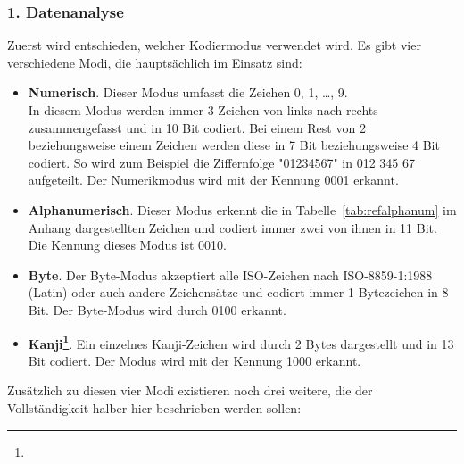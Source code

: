 \subsubsection*{1. Datenanalyse}
Zuerst wird entschieden, welcher Kodiermodus verwendet wird. Es gibt vier verschiedene Modi, die hauptsächlich im Einsatz sind: 
\begin{itemize}
	\item \textbf{Numerisch}. Dieser Modus umfasst die Zeichen  0, 1, \dots, 9. \\
	In diesem Modus werden immer 3 Zeichen von links nach rechts zusammengefasst und in 10 Bit codiert. Bei einem Rest von 2 beziehungsweise einem Zeichen werden diese in 7 Bit beziehungsweise 4 Bit codiert. So wird zum Beispiel die Ziffernfolge "01234567"{} in 012 345 67 aufgeteilt. Der Numerikmodus wird mit der Kennung 0001 erkannt.
	\item \textbf{Alphanumerisch}. Dieser Modus erkennt die in Tabelle~\ref{tab:refalphanum} im Anhang dargestellten Zeichen und codiert immer zwei von ihnen in 11 Bit. Die Kennung dieses Modus ist 0010.
	\item \textbf{Byte}. Der Byte-Modus akzeptiert alle ISO-Zeichen nach ISO-8859-1:1988 (Latin)  oder auch andere Zeichensätze und codiert immer 1 Bytezeichen in 8 Bit. Der Byte-Modus wird durch 0100 erkannt.\pagebreak
	\item \textbf{Kanji\footnote{}}. Ein einzelnes Kanji-Zeichen wird durch 2 Bytes dargestellt und in 13 Bit codiert. Der Modus wird mit der Kennung 1000 erkannt.
\end{itemize}
Zusätzlich zu diesen vier Modi existieren noch drei weitere, die der Vollständigkeit halber hier beschrieben werden sollen:
